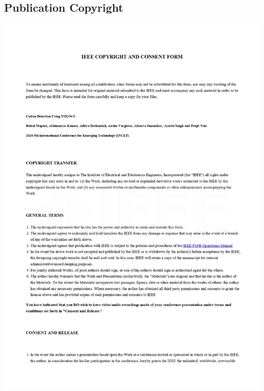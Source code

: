 \documentclass[12pt,a4paper]{report}
\begin{document}
\subsection {Publication Copyright}
\includegraphics[scale =0.7]{images/copyright/publication/PublicationCopyright/PublicationCopyright_page-0001.jpg}
\newpage
\end{document}
